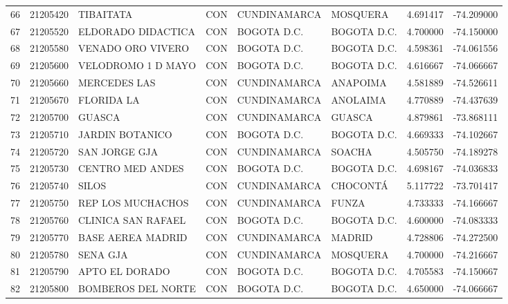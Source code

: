 \documentclass[11pt]{article}
\begin{document}
\begin{table}
\begin{tabular}{lrllllrr}
66  &  21205420 &                TIBAITATA  &  CON &  CUNDINAMARCA &          MOSQUERA &  4.691417 & -74.209000 \\
67  &  21205520 &        ELDORADO DIDACTICA &  CON &   BOGOTA D.C. &       BOGOTA D.C. &  4.700000 & -74.150000 \\
68  &  21205580 &         VENADO ORO VIVERO &  CON &   BOGOTA D.C. &       BOGOTA D.C. &  4.598361 & -74.061556 \\
69  &  21205600 &        VELODROMO 1 D MAYO &  CON &   BOGOTA D.C. &       BOGOTA D.C. &  4.616667 & -74.066667 \\
70  &  21205660 &             MERCEDES LAS  &  CON &  CUNDINAMARCA &          ANAPOIMA &  4.581889 & -74.526611 \\
71  &  21205670 &               FLORIDA LA  &  CON &  CUNDINAMARCA &          ANOLAIMA &  4.770889 & -74.437639 \\
72  &  21205700 &                   GUASCA  &  CON &  CUNDINAMARCA &            GUASCA &  4.879861 & -73.868111 \\
73  &  21205710 &           JARDIN BOTANICO &  CON &   BOGOTA D.C. &       BOGOTA D.C. &  4.669333 & -74.102667 \\
74  &  21205720 &            SAN JORGE GJA  &  CON &  CUNDINAMARCA &            SOACHA &  4.505750 & -74.189278 \\
75  &  21205730 &          CENTRO MED ANDES &  CON &   BOGOTA D.C. &       BOGOTA D.C. &  4.698167 & -74.036833 \\
76  &  21205740 &                    SILOS  &  CON &  CUNDINAMARCA &          CHOCONTÁ &  5.117722 & -73.701417 \\
77  &  21205750 &         REP LOS MUCHACHOS &  CON &  CUNDINAMARCA &             FUNZA &  4.733333 & -74.166667 \\
78  &  21205760 &        CLINICA SAN RAFAEL &  CON &   BOGOTA D.C. &       BOGOTA D.C. &  4.600000 & -74.083333 \\
79  &  21205770 &         BASE AEREA MADRID &  CON &  CUNDINAMARCA &            MADRID &  4.728806 & -74.272500 \\
80  &  21205780 &                 SENA GJA  &  CON &  CUNDINAMARCA &          MOSQUERA &  4.700000 & -74.216667 \\
81  &  21205790 &            APTO EL DORADO &  CON &   BOGOTA D.C. &       BOGOTA D.C. &  4.705583 & -74.150667 \\
82  &  21205800 &        BOMBEROS DEL NORTE &  CON &   BOGOTA D.C. &       BOGOTA D.C. &  4.650000 & -74.066667 \\

\end{tabular}
\end{table}
\end{document}
